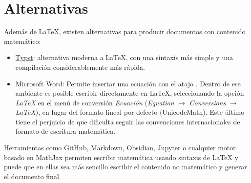 \section{Alternativas}
Además de \LaTeX{}, existen alternativas para producir documentos con contenido matemático:

\begin{itemize}
    \item \href{https://typst.app/}{Typst}: alternativa moderna a \LaTeX{}, con una sintaxis más simple y una compilación considerablemente más rápida.
    \item Microsoft Word: Permite insertar una ecuación con el atajo \keys{\Alt + =}. Dentro de ese ambiente es posible escribir directamente en \LaTeX{}, seleccionando la opción \emph{LaTeX} en el menú de conversión \emph{Ecuación} (\emph{Equation} $\to$ \emph{Conversions} $\to$ \emph{LaTeX}), en lugar del formato lineal por defecto (UnicodeMath). Este último tiene el perjuicio de que dificulta seguir las convenciones internacionales de formato de escritura matemática.
\end{itemize}

Herramientas como GitHub, Markdown, Obsidian, Jupyter o cualquier motor basado en MathJax permiten escribir matemática usando sintaxis de \LaTeX{} y puede que en ellas sea más sencillo escribir el contenido no matemático y generar el documento final.
